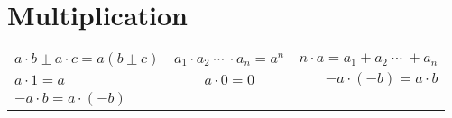 \section{Multiplication}
\begin{center}
    \begin{longtable}{lcr}
        $a \cdot b \pm a \cdot c = a(b \pm c)$
        &
        $a_1 \cdot a_2\ \cdots\ \cdot a_n = a^n$
        &
        $n \cdot a = a_1 + a_2\ \cdots\ + a_n$
        \\
        $a \cdot 1 = a$
        &
        $a \cdot 0 = 0$
        &
        $-a \cdot (-b) = a \cdot b$
        \\
        $-a \cdot b = a \cdot (-b)$
    \end{longtable}
\end{center}
